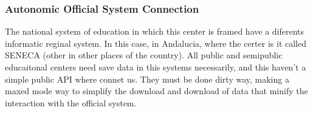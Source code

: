 \bigskip
\subsubsection{Autonomic Official System Connection}
\bigskip

The national system of education in which this center is framed have a diferents informatic reginal system. In this case, in Andalucia, where the certer is it called SENECA (other in other places of the country). All public and semipublic educaitonal centers need save data in this systems necessarily, and this haven't a simple public API where connet us. They must be done dirty way, making a maxed mode way to simplify the download and download of data that minify the interaction with the official system.

